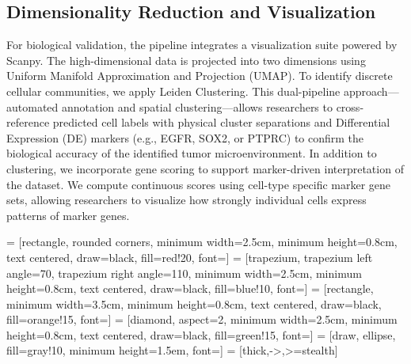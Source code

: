 \documentclass[conference]{IEEEtran}
\begin{document}
\subsection{Dimensionality Reduction and Visualization}
For biological validation, the pipeline integrates a visualization suite powered by Scanpy. The high-dimensional data is projected into two dimensions using Uniform Manifold Approximation and Projection (UMAP). To identify discrete cellular communities, we apply Leiden Clustering. This dual-pipeline approach—automated annotation and spatial clustering—allows researchers to cross-reference predicted cell labels with physical cluster separations and Differential Expression (DE) markers (e.g., EGFR, SOX2, or PTPRC) to confirm the biological accuracy of the identified tumor microenvironment. In addition to clustering, we incorporate gene scoring to support marker-driven interpretation of the dataset. We compute continuous scores using cell-type specific marker gene sets, allowing researchers to visualize how strongly individual cells express patterns of marker genes.

 = [rectangle, rounded corners, minimum width=2.5cm, minimum height=0.8cm, text centered, draw=black, fill=red!20, font=\small]
 = [trapezium, trapezium left angle=70, trapezium right angle=110, minimum width=2.5cm, minimum height=0.8cm, text centered, draw=black, fill=blue!10, font=\small]
 = [rectangle, minimum width=3.5cm, minimum height=0.8cm, text centered, draw=black, fill=orange!15, font=\small]
 = [diamond, aspect=2, minimum width=2.5cm, minimum height=0.8cm, text centered, draw=black, fill=green!15, font=\small]
 = [draw, ellipse, fill=gray!10, minimum height=1.5em, font=\small]
 = [thick,->,>=stealth]
\end{document}

